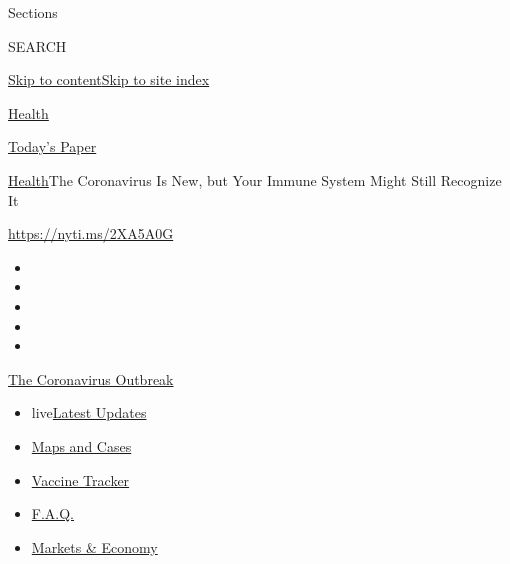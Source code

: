 Sections

SEARCH

\protect\hyperlink{site-content}{Skip to
content}\protect\hyperlink{site-index}{Skip to site index}

\href{https://www.nytimes.com/section/health}{Health}

\href{https://myaccount.nytimes.com/auth/login?response_type=cookie\&client_id=vi}{}

\href{https://www.nytimes.com/section/todayspaper}{Today's Paper}

\href{/section/health}{Health}\textbar{}The Coronavirus Is New, but Your
Immune System Might Still Recognize It

\href{https://nyti.ms/2XA5A0G}{https://nyti.ms/2XA5A0G}

\begin{itemize}
\item
\item
\item
\item
\item
\end{itemize}

\href{https://www.nytimes.com/news-event/coronavirus?action=click\&pgtype=Article\&state=default\&region=TOP_BANNER\&context=storylines_menu}{The
Coronavirus Outbreak}

\begin{itemize}
\tightlist
\item
  live\href{https://www.nytimes.com/2020/08/08/world/coronavirus-updates.html?action=click\&pgtype=Article\&state=default\&region=TOP_BANNER\&context=storylines_menu}{Latest
  Updates}
\item
  \href{https://www.nytimes.com/interactive/2020/us/coronavirus-us-cases.html?action=click\&pgtype=Article\&state=default\&region=TOP_BANNER\&context=storylines_menu}{Maps
  and Cases}
\item
  \href{https://www.nytimes.com/interactive/2020/science/coronavirus-vaccine-tracker.html?action=click\&pgtype=Article\&state=default\&region=TOP_BANNER\&context=storylines_menu}{Vaccine
  Tracker}
\item
  \href{https://www.nytimes.com/interactive/2020/world/coronavirus-tips-advice.html?action=click\&pgtype=Article\&state=default\&region=TOP_BANNER\&context=storylines_menu}{F.A.Q.}
\item
  \href{https://www.nytimes.com/live/2020/08/07/business/stock-market-today-coronavirus?action=click\&pgtype=Article\&state=default\&region=TOP_BANNER\&context=storylines_menu}{Markets
  \& Economy}
\end{itemize}

